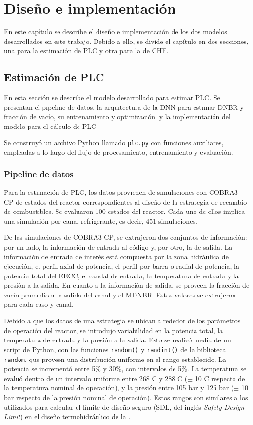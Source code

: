 \chapter{Diseño e implementación} %

\label{Chapter3} 

En este capítulo se describe el diseño e implementación de los dos modelos desarrollados en este trabajo. Debido a ello, se divide el capítulo en dos secciones, una para la estimación de PLC y otra para la de CHF.

\section{Estimación de PLC}
En esta sección se describe el modelo desarrollado para estimar PLC. Se presentan el pipeline de datos, la arquitectura de la DNN para estimar DNBR y fracción de vacío, su entrenamiento y optimización, y la implementación del modelo para el cálculo de PLC.

Se construyó un archivo Python llamado \texttt{plc.py} con funciones auxiliares, empleadas a lo largo del flujo de procesamiento, entrenamiento y evaluación.

\subsection{Pipeline de datos}
\label{sec:plc_pipeline}
Para la estimación de PLC, los datos provienen de simulaciones con COBRA3-CP de estados del reactor correspondientes al diseño de la estrategia de recambio de combustibles. Se evaluaron 100 estados del reactor. Cada uno de ellos implica una simulación por canal refrigerante, es decir, 451 simulaciones.

De las simulaciones de COBRA3-CP, se extrajeron dos conjuntos de información: por un lado, la información de entrada al código y, por otro, la de salida. La información de entrada de interés está compuesta por la zona hidráulica de ejecución, el perfil axial de potencia, el perfil por barra o radial de potencia, la potencia total del EECC, el caudal de entrada, la temperatura de entrada y la presión a la salida. En cuanto a la información de salida, se proveen la fracción de vacío promedio a la salida del canal y el MDNBR. Estos valores se extrajeron para cada caso y canal.

Debido a que los datos de una estrategia se ubican alrededor de los parámetros de operación del reactor, se introdujo variabilidad en la potencia total, la temperatura de entrada y la presión a la salida. Esto se realizó mediante un script de Python, con las funciones \texttt{random()} y \texttt{randint()} de la biblioteca \texttt{random}, que proveen una distribución uniforme en el rango establecido. La potencia se incrementó entre 5\% y 30\%, con intervalos de 5\%. La temperatura se evaluó dentro de un intervalo uniforme entre 268 \degree C y 288 \degree C ($\pm$ 10 \degree C respecto de la temperatura nominal de operación), y la presión entre 105 bar y 125 bar ($\pm$ 10 bar respecto de la presión nominal de operación). Estos rangos son similares a los utilizados para calcular el límite de diseño seguro (SDL, del inglés \textit{Safety Design Limit}) en el diseño termohidráulico de la \cna{}.

